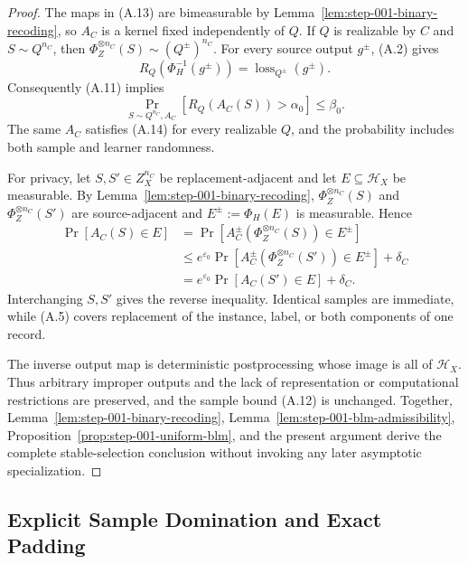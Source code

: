 \begin{proof}
The maps in (A.13) are bimeasurable by
Lemma~\ref{lem:step-001-binary-recoding}, so \(A_C\) is a kernel fixed
independently of \(Q\).  If \(Q\) is realizable by \(C\) and
\(S\sim Q^{n_C}\), then
\(\Phi_Z^{\otimes n_C}(S)\sim(Q^\pm)^{n_C}\).  For every source output
\(g^\pm\), (A.2) gives
\[
R_Q(\Phi_H^{-1}(g^\pm))
=\operatorname{loss}_{Q^\pm}(g^\pm).
\]
Consequently (A.11) implies
\[
\Pr_{S\sim Q^{n_C},A_C}
[R_Q(A_C(S))>\alpha_0]\leq\beta_0.
\tag{A.14}
\]
The same \(A_C\) satisfies (A.14) for every realizable \(Q\), and the
probability includes both sample and learner randomness.

For privacy, let \(S,S'\in Z_X^{n_C}\) be replacement-adjacent and let
\(E\subseteq\mathcal H_X\) be measurable.  By
Lemma~\ref{lem:step-001-binary-recoding},
\(\Phi_Z^{\otimes n_C}(S)\) and
\(\Phi_Z^{\otimes n_C}(S')\) are source-adjacent and
\(E^\pm:=\Phi_H(E)\) is measurable.  Hence
\[
\begin{aligned}
\Pr[A_C(S)\in E]
&=\Pr[A_C^\pm(\Phi_Z^{\otimes n_C}(S))\in E^\pm]\\
&\leq e^{\varepsilon_0}
\Pr[A_C^\pm(\Phi_Z^{\otimes n_C}(S'))\in E^\pm]
+\delta_C\\
&=e^{\varepsilon_0}\Pr[A_C(S')\in E]+\delta_C.
\end{aligned}
\tag{A.15}
\]
Interchanging \(S,S'\) gives the reverse inequality.  Identical
samples are immediate, while (A.5) covers replacement of the
instance, label, or both components of one record.

The inverse output map is deterministic postprocessing whose image is
all of \(\mathcal H_X\).  Thus arbitrary improper outputs and the lack
of representation or computational restrictions are preserved, and
the sample bound (A.12) is unchanged.  Together,
Lemma~\ref{lem:step-001-binary-recoding},
Lemma~\ref{lem:step-001-blm-admissibility},
Proposition~\ref{prop:step-001-uniform-blm}, and the present argument
derive the complete stable-selection conclusion without invoking any
later asymptotic specialization.
\end{proof}
\subsection{Explicit Sample Domination and Exact Padding}
\label{app:sample-domination}

